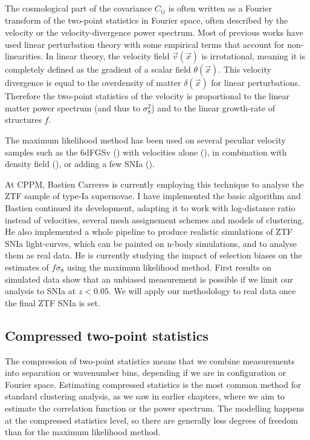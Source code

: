     The cosmological part of the covariance $C_{ij}$ is often written as a 
    Fourier transform of the two-point statistics in Fourier space, 
    often described by the velocity or the velocity-divergence power 
    spectrum. 
    Most of previous works have used linear perturbation theory with  
    some empirical terms that account for non-linearities.  
    In linear theory, the velocity field $\vec{v}(\vec{x})$ is irrotational, meaning it 
    is completely defined as the gradient of a scalar field $\theta(\vec{x})$. 
    This velocity divergence is equal to the overdensity of matter $\delta(\vec{x})$ for linear perturbations. 
    Therefore the two-point statistics of the velocity is proportional to the linear matter power spectrum 
    (and thus to $\sigma^2_8$) and to the linear growth-rate of structures $f$. 

    The maximum likelihood method has been used on several peculiar velocity samples
    such as the 6dFGSv (\cite{campbell6dFGalaxySurvey2014, springob6dFGalaxySurvey2014})
    with velocities alone (\cite{johnson6dFGalaxySurvey2014}), in combination with density field 
    (\cite{adamsImprovingConstraintsGrowth2017, adamsJointGrowthrateMeasurements2020}), 
    or adding a few SNIa (\cite{hutererTestingLCDMLowest2017}). 
    
    At CPPM, Bastien Carreres is currently employing this technique to analyse 
    the ZTF sample of type-Ia supernovae. I have implemented the basic algorithm 
    and Bastien continued its development, adapting it to work with log-distance 
    ratio instead of velocities, several mesh assignement schemes and models of clustering. 
    He also implemented a whole pipeline to produce realistic simulations of ZTF SNIa light-curves, 
    which can be painted on n-body simulations, and to analyse them as real data. 
    He is currently studying 
    the impact of selection biases on the estimates of $f\sigma_8$ using the 
    maximum likelihood method. First results on simulated data show that an unbiased measurement 
    is possible if we limit our analysis to SNIa at $z< 0.05$. 
    We will apply our methodology to real data once the final ZTF SNIa is set. 


    \subsection{Compressed two-point statistics}
    \label{velocities:methods:compressed_two_point} 

    The compression of two-point statistics means that we combine measurements 
    into separation or wavenumber bins, depending if we are in configuration or Fourier space. 
    Estimating compressed statistics is the most common method for  
    standard clustering analysis, as we saw in earlier chapters, 
    where we aim to estimate the correlation function or the power spectrum.
    The modelling happens at the compressed statistics level, so there are generally less 
    degrees of freedom than for the maximum likelihood method. 

